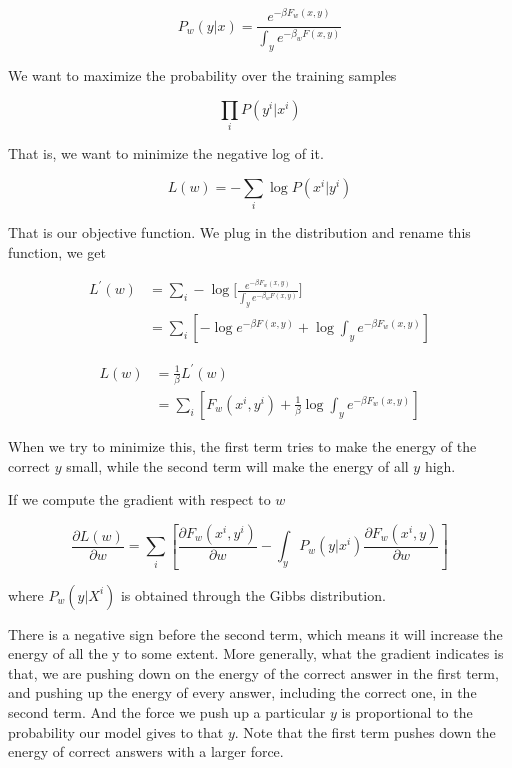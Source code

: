 \begin{equation*}
    P_w(y|x) = \frac{e^{-\beta F_w(x,y)}}{\int_y e^{-\beta_w F(x,y)}}
\end{equation*}

We want to maximize the probability over the training samples

\begin{equation*}
    \prod_{i} P(y^i|x^i)
\end{equation*}

That is, we want to minimize the negative log of it.

\begin{equation*}
    L(w) = -\sum_i \log P(x^i | y^i)
\end{equation*}

That is our objective function. We plug in the distribution and rename this function, we get

\begin{equation*}
    \begin{split}
        L^{'}(w) & = \sum_i -\log \bigg\lbrack\frac{e^{-\beta F_w(x,y)}}{\int_y e^{-\beta_w F(x,y)}}\bigg\rbrack \\
        & = \sum_i [-\log e^{-\beta F(x,y)} + \log\int_y e^{-\beta F_w(x,y)}]
    \end{split}
\end{equation*}

\begin{equation*}
    \begin{split}
        L(w) & = \frac{1}{\beta}L^{'}(w) \\
        & = \sum_i [F_w (x^i,y^i) + \frac{1}{\beta}\log\int_y e^{-\beta F_w(x,y)}]
    \end{split}
\end{equation*}

When we try to minimize this, the first term tries to make the energy of the correct $y$ small, while the second term will make the energy of all $y$ high. 

If we compute the gradient with respect to $w$

\begin{equation*}
    \frac{\partial L(w)}{\partial w} = \sum_{i} [\frac{\partial F_{w}(x^i,y^i)}{\partial w} - \int_y P_{w}(y|x^i)\frac{\partial F_w(x^i,y)}{\partial w}]
\end{equation*}

where $P_w(y|X^i)$ is obtained through the Gibbs distribution.

There is a negative sign before the second term, which means it will increase the energy of all the y to some extent. More generally, what the gradient indicates is that, we are pushing down on the energy of the correct answer in the first term, and pushing up the energy of every answer, including the correct one, in the second term. And the force we push up a particular $y$ is proportional to the probability our model gives to that $y$. Note that the first term pushes down the energy of correct answers with a larger force.

